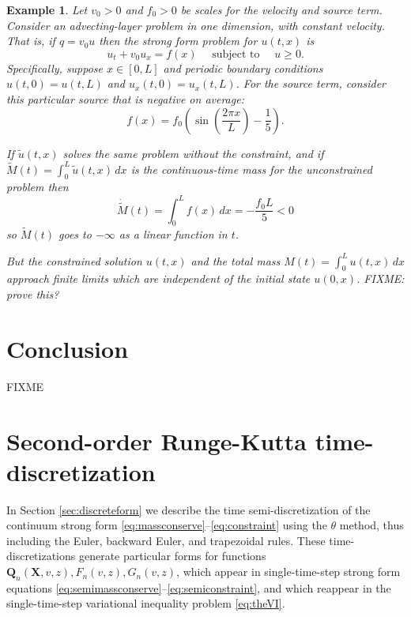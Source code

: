 \documentclass[final,leqno,onefignum,onetabnum]{siamltex1213bueler}
\newtheorem{example}{Example}
\newcommand\bQ{\mathbf{Q}}
\newcommand\bX{\mathbf{X}}
\begin{document}
\begin{example}  Let $v_0>0$ and $f_0>0$ be scales for the velocity and source term.  Consider an advecting-layer problem in one dimension, with constant velocity.  That is, if $q = v_0 u$ then the strong form problem for $u(t,x)$ is
\begin{equation}
u_t + v_0 u_x = f(x) \quad \text{ subject to } \quad u\ge 0.  \label{eq:ex:advectlayer}
\end{equation}
Specifically, suppose $x\in[0,L]$ and periodic boundary conditions $u(t,0)=u(t,L)$ and $u_x(t,0)=u_x(t,L)$.  For the source term, consider this particular source that is negative on average:
    $$f(x) = f_0 \left(\sin\left(\frac{2\pi x}{L}\right) - \frac{1}{5}\right).$$

If $\tilde u(t,x)$ solves the same problem without the constraint, and if $\tilde M(t) = \int_0^L \tilde u(t,x)\,dx$ is the continuous-time mass for the unconstrained problem then
    $$\dot{\tilde M}(t) = \int_0^L f(x)\,dx = -\frac{f_0 L}{5} < 0$$
so $\tilde M(t)$ goes to $-\infty$ as a linear function in $t$.

But the constrained solution $u(t,x)$ and the total mass $M(t) = \int_0^L u(t,x)\,dx$ approach finite limits which are independent of the initial state $u(0,x)$.  FIXME: prove this?
\end{example}

\section{Conclusion} \label{sec:conclusion}  FIXME






\Appendix

\section{Second-order Runge-Kutta time-discretization}   In Section \ref{sec:discreteform} we describe the time semi-discretization of the continuum strong form \eqref{eq:massconserve}--\eqref{eq:constraint} using the $\theta$ method, thus including the Euler, backward Euler, and trapezoidal rules.  These time-discretizations generate particular forms for functions $\bQ_n(\bX,v,z),F_n(v,z),G_n(v,z)$, which appear in single-time-step strong form equations \eqref{eq:semimassconserve}--\eqref{eq:semiconstraint}, and which reappear in the single-time-step variational inequality problem \eqref{eq:theVI}.
\end{document}
